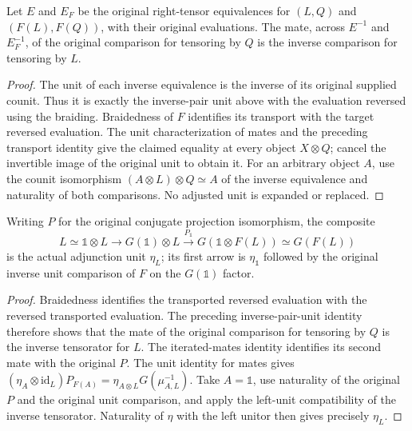 \begin{lemma}
\label{lem:line-pf-original-inverse-tensor-mate}
\leanok
Let $E$ and $E_F$ be the original right-tensor equivalences for
$(L,Q)$ and $(F(L),F(Q))$, with their original evaluations.
The mate, across $E^{-1}$ and $E_F^{-1}$, of the original comparison
for tensoring by $Q$ is the inverse comparison for tensoring by $L$.
\end{lemma}
\begin{proof}
The unit of each inverse equivalence is the inverse of its original
supplied counit.  Thus it is exactly the inverse-pair unit above with
the evaluation reversed using the braiding.  Braidedness of $F$
identifies its transport with the target reversed evaluation.
The unit characterization of mates and the preceding transport
identity give the claimed equality at every object $X\otimes Q$;
cancel the invertible image of the original unit to obtain it.
For an arbitrary object $A$, use the counit isomorphism
$(A\otimes L)\otimes Q\simeq A$ of the inverse equivalence and
naturality of both comparisons.  No adjusted unit is expanded or
replaced.
\end{proof}

\begin{lemma}
\label{lem:line-pf-original-unit-normalization}
\leanok
Writing $P$ for the original conjugate projection isomorphism, the
composite
\[
 L\simeq\mathbb1\otimes L
 \longrightarrow G(\mathbb1)\otimes L
 \xrightarrow{P_{\mathbb1}}G(\mathbb1\otimes F(L))
 \simeq G(F(L))
\]
is the actual adjunction unit $\eta_L$; its first arrow is
$\eta_{\mathbb1}$ followed by the original inverse unit comparison
of $F$ on the $G(\mathbb1)$ factor.
\end{lemma}
\begin{proof}
Braidedness identifies the transported reversed evaluation with the
reversed transported evaluation.  The preceding inverse-pair-unit
identity therefore shows that the mate of the original comparison for
tensoring by $Q$ is the inverse tensorator for $L$.
The iterated-mates identity identifies its second mate with the
original $P$.  The unit identity for mates gives
$(\eta_A\otimes\mathrm{id}_L)P_{F(A)}
=\eta_{A\otimes L}G(\mu_{A,L}^{-1})$.
Take $A=\mathbb1$, use naturality of the original $P$ and the original
unit comparison, and apply the left-unit compatibility of the inverse
tensorator.  Naturality of $\eta$ with the left unitor then gives
precisely $\eta_L$.
\end{proof}

